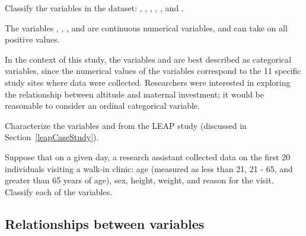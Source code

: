 \begin{examplewrap}
\begin{nexample}{Classify the variables in the  dataset: , , , , , and .}

The variables , , , and  are continuous numerical variables, and can take on all positive values.

In the context of this study, the variables  and  are best described as categorical variables, since the numerical values of the variables correspond to the 11 specific study sites where data were collected. Researchers were interested in exploring the relationship between altitude and maternal investment; it would be reasonable to consider  an ordinal categorical variable.
\end{nexample}
\end{examplewrap}

\begin{exercisewrap}
\begin{nexercise} 
	Characterize the variables  and  from the LEAP study (discussed in Section~\ref{leapCaseStudy}).\footnotemark{}
\end{nexercise}
\end{exercisewrap}

\begin{exercisewrap}
\begin{nexercise}
Suppose that on a given day, a research assistant collected data on the first 20 individuals visiting a walk-in clinic: age (measured as less than 21, 21 - 65, and greater than 65 years of age), sex, height, weight, and reason for the visit.  Classify each of the variables.\footnotemark{}
\end{nexercise}
\end{exercisewrap}


\textD{\newpage}


\subsection{Relationships between variables}
\label{variableRelations}

